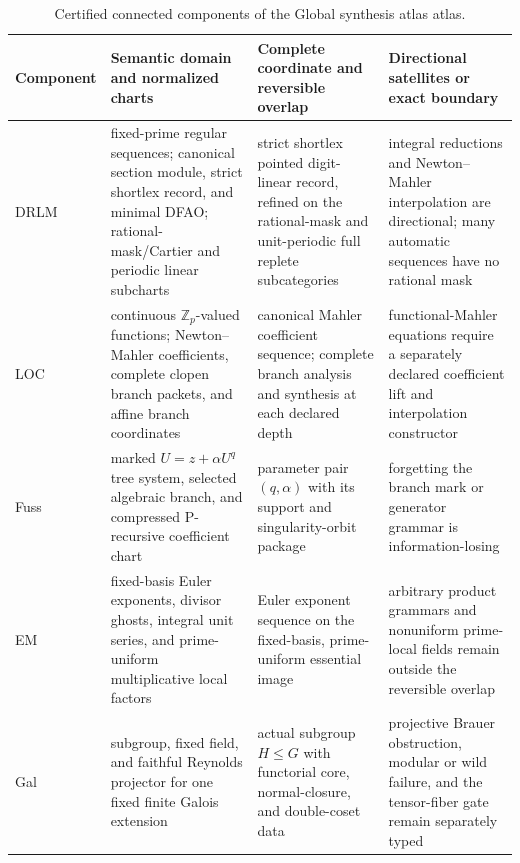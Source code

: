 \begin{table}[htbp]
\centering
\caption{Certified connected components of the Global synthesis atlas atlas.}
\label{tab:block13-components}
\tiny
\begin{tabularx}{\textwidth}{@{}L{0.105\textwidth}L{0.255\textwidth}L{0.285\textwidth}Y@{}}
\toprule
Component & Semantic domain and normalized charts & Complete coordinate and reversible overlap & Directional satellites or exact boundary\\
\midrule
DRLM & fixed-prime regular sequences; canonical section module, strict shortlex record, and minimal DFAO; rational-mask/Cartier and periodic linear subcharts & strict shortlex pointed digit-linear record, refined on the rational-mask and unit-periodic full replete subcategories & integral reductions and Newton--Mahler interpolation are directional; many automatic sequences have no rational mask\\
LOC & continuous $\mathbb Z_p$-valued functions; Newton--Mahler coefficients, complete clopen branch packets, and affine branch coordinates & canonical Mahler coefficient sequence; complete branch analysis and synthesis at each declared depth & functional-Mahler equations require a separately declared coefficient lift and interpolation constructor\\
Fuss & marked $U=z+\alpha U^q$ tree system, selected algebraic branch, and compressed P-recursive coefficient chart & parameter pair $(q,\alpha)$ with its support and singularity-orbit package & forgetting the branch mark or generator grammar is information-losing\\
EM & fixed-basis Euler exponents, divisor ghosts, integral unit series, and prime-uniform multiplicative local factors & Euler exponent sequence on the fixed-basis, prime-uniform essential image & arbitrary product grammars and nonuniform prime-local fields remain outside the reversible overlap\\
Gal & subgroup, fixed field, and faithful Reynolds projector for one fixed finite Galois extension & actual subgroup $H\leq G$ with functorial core, normal-closure, and double-coset data & projective Brauer obstruction, modular or wild failure, and the tensor-fiber gate remain separately typed\\
\bottomrule
\end{tabularx}
\end{table}
